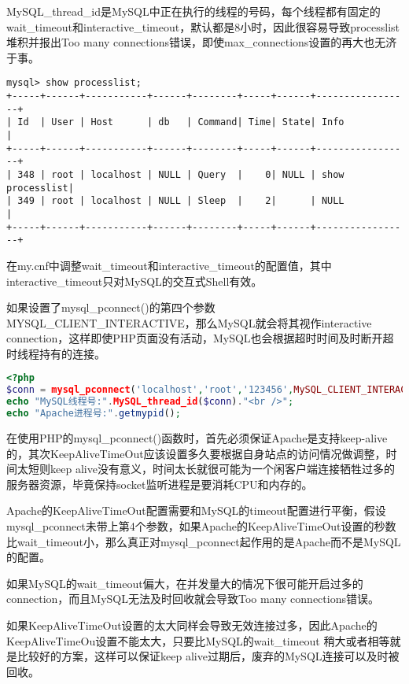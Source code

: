 MySQL\_thread\_id是MySQL中正在执行的线程的号码，每个线程都有固定的wait\_timeout和interactive\_timeout，默认都是8小时，因此很容易导致processlist堆积并报出Too many connections错误，即使max\_connections设置的再大也无济于事。

\begin{verbatim}
mysql> show processlist;
+-----+------+-----------+------+--------+-----+------+-----------------+
| Id  | User | Host      | db   | Command| Time| State| Info            |
+-----+------+-----------+------+--------+-----+------+-----------------+
| 348 | root | localhost | NULL | Query  |    0| NULL | show processlist|
| 349 | root | localhost | NULL | Sleep  |    2|      | NULL            |
+-----+------+-----------+------+--------+-----+------+-----------------+
\end{verbatim}

在my.cnf中调整wait\_timeout和interactive\_timeout的配置值，其中interactive\_timeout只对MySQL的交互式Shell有效。

如果设置了mysql\_pconnect()的第四个参数MYSQL\_CLIENT\_INTERACTIVE，那么MySQL就会将其视作interactive connection，这样即使PHP页面没有活动，MySQL也会根据超时时间及时断开超时线程持有的连接。

\begin{lstlisting}[language=PHP]
<?php
$conn = mysql_pconnect('localhost','root','123456',MySQL_CLIENT_INTERACTIVE);
echo "MySQL线程号:".MySQL_thread_id($conn)."<br />";
echo "Apache进程号:".getmypid();
\end{lstlisting}

在使用PHP的mysql\_pconnect()函数时，首先必须保证Apache是支持keep-alive的，其次KeepAliveTimeOut应该设置多久要根据自身站点的访问情况做调整，时间太短则keep alive没有意义，时间太长就很可能为一个闲客户端连接牺牲过多的服务器资源，毕竟保持socket监听进程是要消耗CPU和内存的。

Apache的KeepAliveTimeOut配置需要和MySQL的timeout配置进行平衡，假设mysql\_pconnect未带上第4个参数，如果Apache的KeepAliveTimeOut设置的秒数比wait\_timeout小，那么真正对mysql\_pconnect起作用的是Apache而不是MySQL的配置。

如果MySQL的wait\_timeout偏大，在并发量大的情况下很可能开启过多的connection，而且MySQL无法及时回收就会导致Too many connections错误。

如果KeepAliveTimeOut设置的太大同样会导致无效连接过多，因此Apache的KeepAliveTimeOu设置不能太大，只要比MySQL的wait\_timeout 稍大或者相等就是比较好的方案，这样可以保证keep alive过期后，废弃的MySQL连接可以及时被回收。


